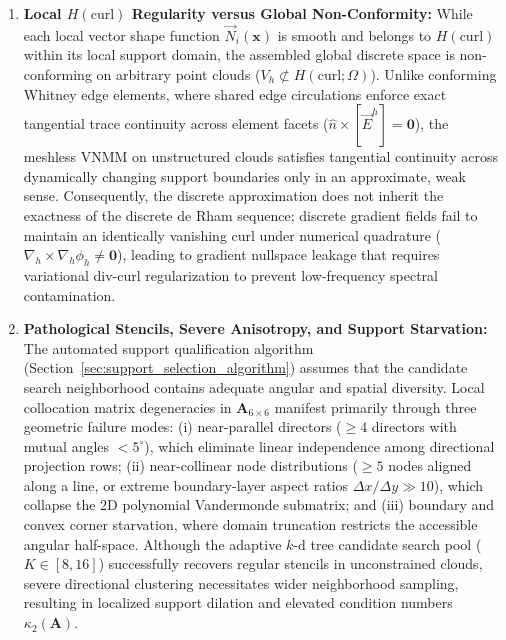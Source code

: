 \documentclass[preprint,12pt]{elsarticle}
\begin{document}
\begin{enumerate}
    \item \textbf{Local $H(\mathrm{curl})$ Regularity versus Global Non-Conformity:} 
    While each local vector shape function $\vec{N}_i(\mathbf{x})$ is smooth and belongs to $H(\mathrm{curl})$ within its local support domain, the assembled global discrete space is non-conforming on arbitrary point clouds ($V_h \not\subset H(\mathrm{curl}; \Omega)$). Unlike conforming Whitney edge elements, where shared edge circulations enforce exact tangential trace continuity across element facets ($\hat{n} \times [\vec{E}^h] = \mathbf{0}$), the meshless VNMM on unstructured clouds satisfies tangential continuity across dynamically changing support boundaries only in an approximate, weak sense. Consequently, the discrete approximation does not inherit the exactness of the discrete de Rham sequence; discrete gradient fields fail to maintain an identically vanishing curl under numerical quadrature ($\nabla_h \times \nabla_h \phi_h \neq \mathbf{0}$), leading to gradient nullspace leakage that requires variational div-curl regularization to prevent low-frequency spectral contamination.

    \item \textbf{Pathological Stencils, Severe Anisotropy, and Support Starvation:} 
    The automated support qualification algorithm (Section~\ref{sec:support_selection_algorithm}) assumes that the candidate search neighborhood contains adequate angular and spatial diversity. Local collocation matrix degeneracies in $\mathbf{A}_{6 \times 6}$ manifest primarily through three geometric failure modes: (i) near-parallel directors ($\ge 4$ directors with mutual angles $< 5^\circ$), which eliminate linear independence among directional projection rows; (ii) near-collinear node distributions ($\ge 5$ nodes aligned along a line, or extreme boundary-layer aspect ratios $\Delta x / \Delta y \gg 10$), which collapse the 2D polynomial Vandermonde submatrix; and (iii) boundary and convex corner starvation, where domain truncation restricts the accessible angular half-space. Although the adaptive $k$-d tree candidate search pool ($K \in [8, 16]$) successfully recovers regular stencils in unconstrained clouds, severe directional clustering necessitates wider neighborhood sampling, resulting in localized support dilation and elevated condition numbers $\kappa_2(\mathbf{A})$.


\end{enumerate}
\end{document}
